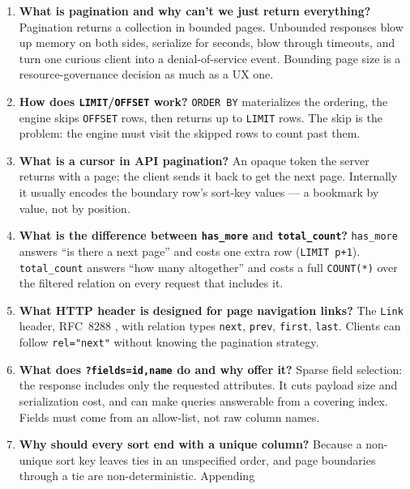 \begin{enumerate}[label=\textbf{Q\arabic*.}, leftmargin=2.6em]
  \item \textbf{What is pagination and why can't we just return everything?}
        Pagination returns a collection in bounded pages. Unbounded
        responses blow up memory on both sides, serialize for seconds, blow
        through timeouts, and turn one curious client into a denial-of-service
        event. Bounding page size is a resource-governance decision as much
        as a UX one.
  \item \textbf{How does \texttt{LIMIT}/\texttt{OFFSET} work?}
        \texttt{ORDER BY} materializes the ordering, the engine skips
        \texttt{OFFSET} rows, then returns up to \texttt{LIMIT} rows. The
        skip is the problem: the engine must visit the skipped rows to count
        past them.
  \item \textbf{What is a cursor in API pagination?}
        An opaque token the server returns with a page; the client sends it
        back to get the next page. Internally it usually encodes the
        boundary row's sort-key values --- a bookmark by value, not by
        position.
  \item \textbf{What is the difference between \texttt{has\_more} and
        \texttt{total\_count}?}
        \texttt{has\_more} answers ``is there a next page'' and costs one
        extra row (\texttt{LIMIT p+1}). \texttt{total\_count} answers ``how
        many altogether'' and costs a full \texttt{COUNT(*)} over the
        filtered relation on every request that includes it.
  \item \textbf{What HTTP header is designed for page navigation links?}
        The \texttt{Link} header, RFC~8288 \cite{rfc8288}, with relation
        types \texttt{next}, \texttt{prev}, \texttt{first}, \texttt{last}.
        Clients can follow \texttt{rel="next"} without knowing the
        pagination strategy.
  \item \textbf{What does \texttt{?fields=id,name} do and why offer it?}
        Sparse field selection: the response includes only the requested
        attributes. It cuts payload size and serialization cost, and can
        make queries answerable from a covering index. Fields must come from
        an allow-list, not raw column names.
  \item \textbf{Why should every sort end with a unique column?}
        Because a non-unique sort key leaves ties in an unspecified order,
        and page boundaries through a tie are non-deterministic. Appending

\end{enumerate}
